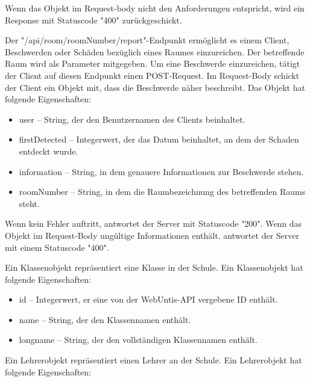 Wenn das Objekt im Request-body nicht den Anforderungen entspricht, wird ein Response mit Statuscode "400" zurückgeschickt. 


Der "/api/room/{roomNumber}/report"-Endpunkt ermöglicht es einem Client, Beschwerden oder Schäden bezüglich eines Raumes einzureichen. Der betreffende Raum wird als Parameter mitgegeben. Um eine Beschwerde einzureichen, tätigt der Client auf diesen Endpunkt einen POST-Request. Im Request-Body schickt der Client ein Objekt mit, dass die Beschwerde näher beschreibt. Das Objekt hat folgende Eigenschaften:

\begin{itemize}
    \item user -- String, der den Benutzernamen des Clients beinhaltet.
    \item firstDetected -- Integerwert, der das Datum beinhaltet, an dem der Schaden entdeckt wurde. 
    \item information -- String, in dem genauere Informationen zur Beschwerde stehen. 
    \item roomNumber -- String, in dem die Raumbezeichnung des betreffenden Raums steht. 
\end{itemize}

Wenn kein Fehler auftritt, antwortet der Server mit Statuscode "200". Wenn das Objekt im Request-Body ungültige Informationen enthält, antwortet der Server mit einem Statuscode "400".


Ein Klassenobjekt repräsentiert eine Klasse in der Schule. Ein Klassenobjekt hat folgende Eigenschaften: 

\begin{itemize}
    \item id -- Integerwert, er eine von der WebUntis-API vergebene ID enthält. 
    \item name -- String, der den Klassennamen enthält. 
    \item longname -- String, der den vollständigen Klassennamen enthält. 
\end{itemize}


Ein Lehrerobjekt repräsentiert einen Lehrer an der Schule. Ein Lehrerobjekt hat folgende Eigenschaften: 

